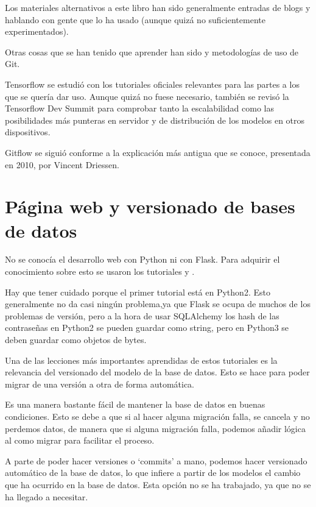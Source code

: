 Los materiales alternativos a este libro han sido  generalmente entradas de blogs y hablando con gente que lo ha usado \cite{fow06, dancont} (aunque quizá no suficientemente experimentados). 

Otras cosas que se han tenido que aprender han sido  y metodologías de uso de Git\cite{vin10}. 

Tensorflow se estudió con los tutoriales oficiales relevantes para las partes a los que se quería dar uso. Aunque quizá no fuese necesario, también se revisó la Tensorflow Dev Summit \cite{tfds} para comprobar tanto la escalabilidad como las posibilidades más punteras en servidor y de distribución de los modelos en otros dispositivos.

Gitflow se siguió conforme a la explicación más antigua que se conoce, presentada en 2010, por Vincent Driessen\cite{vin10}.

\section{Página web y versionado de bases de datos}

No se conocía el desarrollo web con Python ni con Flask. Para adquirir el conocimiento sobre esto se usaron los tutoriales  y .

Hay que tener cuidado porque el primer tutorial está en Python2. Esto generalmente no da casi ningún problema,ya que Flask se ocupa de muchos de los problemas de versión, pero a la hora de usar SQLAlchemy los hash de las contraseñas en Python2 se pueden guardar como string, pero en Python3 se deben guardar como objetos de bytes.

Una de las lecciones más importantes aprendidas de estos tutoriales es la relevancia del versionado del modelo de la base de datos. Esto se hace para poder migrar de una versión a otra de forma automática. 

Es una manera bastante fácil de mantener la base de datos en buenas condiciones. Esto se debe a que si al hacer alguna migración falla, se cancela y no perdemos datos, de manera que si alguna migración falla, podemos añadir lógica al como migrar para facilitar el proceso.

A parte de poder hacer versiones o `commits' a mano, podemos hacer versionado automático de la base de datos, lo que infiere a partir de los modelos el cambio que ha ocurrido en la base de datos. Esta opción no se ha trabajado, ya que no se ha llegado a necesitar.

